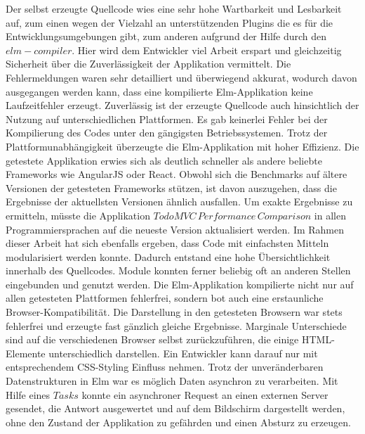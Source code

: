 Der selbst erzeugte Quellcode wies eine sehr hohe Wartbarkeit und Lesbarkeit auf, zum einen wegen der Vielzahl an unterstützenden Plugins die es für die Entwicklungsumgebungen gibt, zum anderen aufgrund der Hilfe durch den $elm-compiler$. Hier wird dem Entwickler viel Arbeit erspart und gleichzeitig Sicherheit über die Zuverlässigkeit der Applikation vermittelt. Die Fehlermeldungen waren sehr detailliert und überwiegend akkurat, wodurch davon ausgegangen werden kann, dass eine kompilierte Elm-Applikation keine Laufzeitfehler erzeugt. Zuverlässig ist der erzeugte Quellcode auch hinsichtlich der Nutzung auf unterschiedlichen Plattformen. Es gab keinerlei Fehler bei der Kompilierung des Codes unter den gängigsten Betriebssystemen. Trotz der Plattformunabhängigkeit überzeugte die Elm-Applikation mit hoher Effizienz. Die getestete Applikation erwies sich als deutlich schneller als andere beliebte Frameworks wie AngularJS oder React. Obwohl sich die Benchmarks auf ältere Versionen der getesteten Frameworks stützen, ist davon auszugehen, dass die Ergebnisse der aktuellsten Versionen ähnlich ausfallen. Um exakte Ergebnisse zu ermitteln, müsste die Applikation $TodoMVC\,Performance\,Comparison$ in allen Programmiersprachen auf die neueste Version aktualisiert werden.
Im Rahmen dieser Arbeit hat sich ebenfalls ergeben, dass Code mit einfachsten Mitteln modularisiert werden konnte. Dadurch entstand eine hohe Übersichtlichkeit innerhalb des Quellcodes. Module konnten ferner beliebig oft an anderen Stellen eingebunden und genutzt werden.
Die Elm-Applikation kompilierte nicht nur auf allen getesteten Plattformen fehlerfrei, sondern bot auch eine erstaunliche Browser-Kompatibilität. Die Darstellung in den getesteten Browsern war stets fehlerfrei und erzeugte fast gänzlich gleiche Ergebnisse. Marginale Unterschiede sind auf die verschiedenen Browser selbst zurückzuführen, die einige \ac{HTML}-Elemente unterschiedlich darstellen. Ein Entwickler kann darauf nur mit entsprechendem \ac{CSS}-Styling Einfluss nehmen.
Trotz der unveränderbaren Datenstrukturen in Elm war es möglich Daten asynchron zu verarbeiten. Mit Hilfe eines $Tasks$ konnte ein asynchroner Request an einen externen Server gesendet, die Antwort ausgewertet und auf dem Bildschirm dargestellt werden, ohne den Zustand der Applikation zu gefährden und einen Absturz zu erzeugen.

